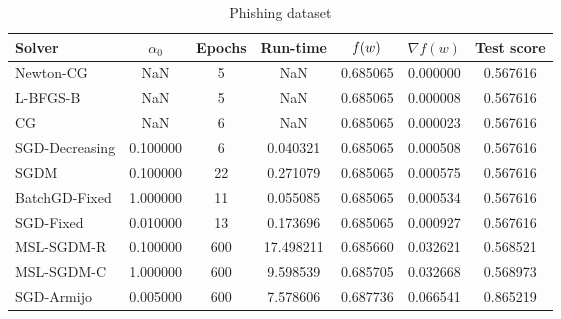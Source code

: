 \begin{table}
\caption{Phishing dataset}
\label{tab:phish-tab}
\centering
\begin{tabular}{lS[round-precision=3]S[drop-zero-decimal]S[round-precision=4]S[round-precision=6]S[exponent-mode=scientific]S[round-precision=6]}
\toprule
Solver & {$\alpha_0$} & {Epochs} & {Run-time} & {$\operatorname*{\mathit{f}}(w)$} & {$\nabla f(w)$} & {Test score} \\
\midrule
Newton-CG & NaN & 5 & NaN & 0.685065 & 0.000000 & 0.567616 \\
L-BFGS-B & NaN & 5 & NaN & 0.685065 & 0.000008 & 0.567616 \\
CG & NaN & 6 & NaN & 0.685065 & 0.000023 & 0.567616 \\
SGD-Decreasing & 0.100000 & 6 & 0.040321 & 0.685065 & 0.000508 & 0.567616 \\
SGDM & 0.100000 & 22 & 0.271079 & 0.685065 & 0.000575 & 0.567616 \\
BatchGD-Fixed & 1.000000 & 11 & 0.055085 & 0.685065 & 0.000534 & 0.567616 \\
SGD-Fixed & 0.010000 & 13 & 0.173696 & 0.685065 & 0.000927 & 0.567616 \\
MSL-SGDM-R & 0.100000 & 600 & 17.498211 & 0.685660 & 0.032621 & 0.568521 \\
MSL-SGDM-C & 1.000000 & 600 & 9.598539 & 0.685705 & 0.032668 & 0.568973 \\
SGD-Armijo & 0.005000 & 600 & 7.578606 & 0.687736 & 0.066541 & 0.865219 \\
\bottomrule
\end{tabular}
\end{table}

